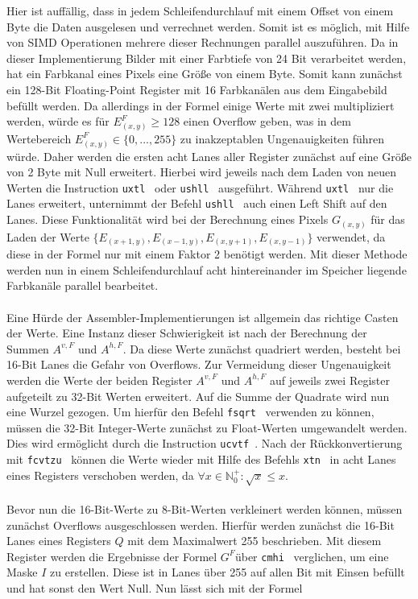 \documentclass[course=asp]{aspdoc}
\begin{document}
\noindent Hier ist auffällig, dass in jedem Schleifendurchlauf mit einem Offset von einem Byte die Daten ausgelesen und verrechnet werden. Somit ist es möglich, mit Hilfe von SIMD Operationen mehrere dieser Rechnungen parallel auszuführen. Da in dieser Implementierung Bilder mit einer Farbtiefe von 24 Bit verarbeitet werden, hat ein Farbkanal eines Pixels eine Größe von einem Byte. Somit kann zunächst ein 128-Bit Floating-Point Register mit 16 Farbkanälen aus dem Eingabebild befüllt werden. Da allerdings in der Formel einige Werte mit zwei multipliziert werden, würde  es für $E_{(x,y)}^F \geq 128$ einen Overflow geben, was in dem Wertebereich $E_{(x,y)}^F\in \{0,... ,255\}$ zu inakzeptablen Ungenauigkeiten führen würde. Daher werden die ersten acht Lanes aller Register zunächst auf eine Größe von 2 Byte mit Null erweitert. Hierbei wird jeweils nach dem  Laden von neuen Werten die Instruction \texttt{uxtl}~\cite{arm2017man} oder \texttt{ushll}~\cite{arm2017man} ausgeführt. Während \texttt{uxtl}~\cite{arm2017man} nur die Lanes erweitert, unternimmt der Befehl \texttt{ushll}~\cite{arm2017man} auch einen Left Shift auf den Lanes. Diese Funktionalität wird bei der Berechnung eines Pixels $G_{(x,y)}$ für das Laden der Werte $\{E_{(x+1,y)}, E_{(x-1,y)}, E_{(x,y+1)}, E_{(x,y-1)}\}$ verwendet, da diese in der Formel nur mit einem Faktor 2 benötigt werden. Mit dieser Methode werden nun in einem Schleifendurchlauf acht hintereinander im Speicher liegende Farbkanäle parallel bearbeitet.\\\\ Eine Hürde der Assembler-Implementierungen ist allgemein das richtige Casten der Werte. Eine Instanz dieser Schwierigkeit ist nach der Berechnung der Summen $A^{v,F}$ und $A^{h,F}$. Da diese Werte zunächst quadriert werden, besteht bei 16-Bit Lanes die Gefahr von Overflows. Zur Vermeidung dieser Ungenauigkeit   werden die Werte der beiden Register $A^{v,F}$ und $A^{h,F}$ auf jeweils zwei Register aufgeteilt zu 32-Bit Werten erweitert. Auf die Summe der Quadrate wird nun eine Wurzel gezogen. Um hierfür den Befehl \texttt{fsqrt}~\cite{arm2017man} verwenden zu können, müssen die 32-Bit Integer-Werte zunächst zu Float-Werten umgewandelt werden. Dies wird ermöglicht durch die Instruction \texttt{ucvtf}~\cite{arm2017man}. Nach der Rückkonvertierung mit \texttt{fcvtzu}~\cite{arm2017man} können die Werte wieder mit Hilfe des Befehls \texttt{xtn}~\cite{arm2017man} in acht Lanes eines Registers verschoben werden, da $\forall x \in \mathbb{N}_0^+: \sqrt{x} \leq x$.\\\\Bevor nun die 16-Bit-Werte zu 8-Bit-Werten verkleinert werden können, müssen zunächst Overflows ausgeschlossen werden. Hierfür werden zunächst die 16-Bit Lanes eines Registers $Q$ mit dem Maximalwert 255 beschrieben. Mit diesem Register werden die Ergebnisse der Formel $G^F$über \texttt{cmhi}~\cite{arm2017man} verglichen, um eine Maske $I$ zu erstellen. Diese ist in Lanes über 255 auf allen Bit mit Einsen befüllt und hat sonst den Wert Null. Nun lässt sich mit der Formel
\end{document}
